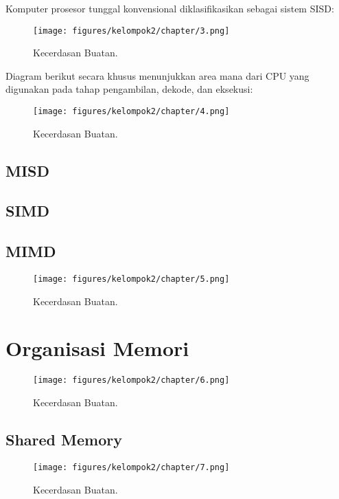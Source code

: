 \noindent
Komputer prosesor tunggal konvensional diklasifikasikan sebagai sistem SISD:

\begin{figure}[H]
	\texttt{[image: figures/kelompok2/chapter/3.png]}
	\centering
	\caption{Kecerdasan Buatan.}
\end{figure}

\noindent
Diagram berikut secara khusus menunjukkan area mana dari CPU yang digunakan pada tahap pengambilan, dekode, dan eksekusi:

\begin{figure}[H]
	\texttt{[image: figures/kelompok2/chapter/4.png]}
	\centering
	\caption{Kecerdasan Buatan.}
\end{figure}

\subsection{MISD}

\subsection{SIMD}

\subsection{MIMD}

\begin{figure}[H]
	\texttt{[image: figures/kelompok2/chapter/5.png]}
	\centering
	\caption{Kecerdasan Buatan.}
\end{figure}

\section{Organisasi Memori}

\begin{figure}[H]
	\texttt{[image: figures/kelompok2/chapter/6.png]}
	\centering
	\caption{Kecerdasan Buatan.}
\end{figure}

\subsection{Shared Memory}

\begin{figure}[H]
	\texttt{[image: figures/kelompok2/chapter/7.png]}
	\centering
	\caption{Kecerdasan Buatan.}
\end{figure}

